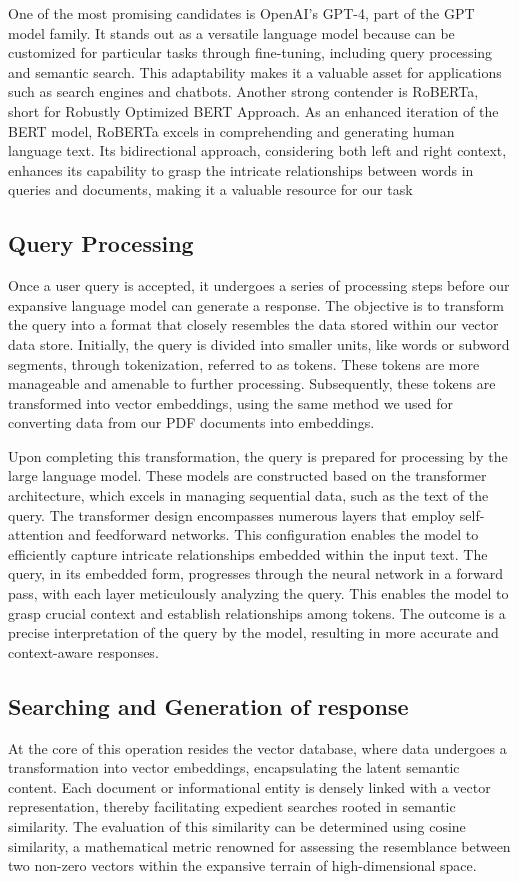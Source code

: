 \documentclass[fleqn,10pt]{thescipub} %
\begin{document}
One of the most promising candidates is OpenAI's GPT-4, part of the GPT model family. It stands out as a versatile language model because can be customized for particular tasks through fine-tuning, including query processing and semantic search. This adaptability makes it a valuable asset for applications such as search engines and chatbots. Another strong contender is RoBERTa, short for Robustly Optimized BERT Approach. As an enhanced iteration of the BERT model, RoBERTa excels in comprehending and generating human language text. Its bidirectional approach, considering both left and right context, enhances its capability to grasp the intricate relationships between words in queries and documents, making it a valuable resource for our task

\subsection{Query Processing}
Once a user query is accepted, it undergoes a series of processing steps before our expansive language model can generate a response. The objective is to transform the query into a format that closely resembles the data stored within our vector data store. Initially, the query is divided into smaller units, like words or subword segments, through tokenization, referred to as tokens. These tokens are more manageable and amenable to further processing. Subsequently, these tokens are transformed into vector embeddings, using the same method we used for  converting data from our PDF documents into embeddings.

Upon completing this transformation, the query is prepared for processing by the large language model. These models are constructed based on the transformer architecture, which excels in managing sequential data, such as the text of the query. The transformer design encompasses numerous layers that employ self-attention and feedforward networks. This configuration enables the model to efficiently capture intricate relationships embedded within the input text. The query, in its embedded form, progresses through the neural network in a forward pass, with each layer meticulously analyzing the query. This enables the model to grasp crucial context and establish relationships among tokens. The outcome is a precise interpretation of the query by the model, resulting in more accurate and context-aware responses.

\subsection{Searching and Generation of response}
At the core of this operation resides the vector database, where data undergoes a transformation into vector embeddings, encapsulating the latent semantic content. Each document or informational entity is densely linked with a vector representation, thereby facilitating expedient searches rooted in semantic similarity. The evaluation of this similarity can be determined using cosine similarity, a mathematical metric renowned for assessing the resemblance between two non-zero vectors within the expansive terrain of high-dimensional space.
\end{document}
